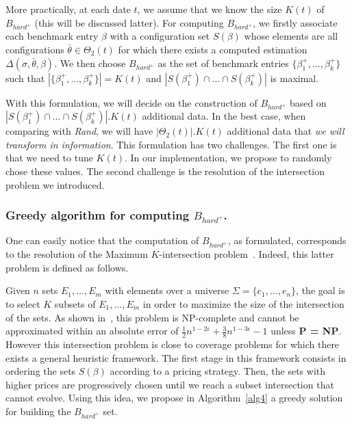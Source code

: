 \documentclass[10pt, conference, compsocconf]{IEEEtran}
\begin{document}
More practically, at each date $t$, we assume that we know the size
$K(t)$ of $B_{hard^+}$ (this will be discussed latter).  For computing
$B_{hard^+}$, we firstly associate each benchmark entry $\beta$ with a
configuration set $S(\beta)$ whose elements are all configurations
$\bar{\theta} \in \Theta_2(t)$ for which there exists a computed
estimation $\Delta(\sigma, \bar{\theta}, \beta)$. We then choose
$B_{hard^+}$ as the set of benchmark entries
$\{ \beta^+_1, \dots, \beta^+_k \}$ such that
$|\{ \beta^+_1, \dots, \beta^+_k \}| = K(t)$ and
$|S(\beta^+_1) \cap \dots \cap S(\beta^+_k)|$ is maximal.


With this formulation, we will decide on the construction of
$B_{hard^+}$ based on
$|S(\beta^+_1) \cap \dots \cap S(\beta^+_k)|.K(t)$ additional data. In
the best case, when comparing with {\it Rand}, we will have
$|\Theta_2(t)|.K(t)$ additional data that {\it we will transform in
  information}.  This formulation has two challenges. The first one is
that we need to tune $K(t)$. In our implementation, we propose to
randomly chose these values. The second challenge is the resolution of
the intersection problem we introduced.

\subsubsection{ Greedy algorithm for computing $B_{hard^+}$.}

One can easily notice that the computation of $B_{hard^+}$, as
formulated, corresponds to the resolution of the Maximum $K$-intersection
problem~\cite{DBLP:journals/ipl/ShiehTY12}.  Indeed, this latter
problem is defined as follows.

Given $n$ sets $E_1,\dots,E_m$ with elements over a universe
$\Sigma = \{ e_1,\dots,e_n  \}$, the goal is to select $K$ subsets of
$E_1,\dots,E_m$ in order to maximize the size of the intersection of
the sets.  As shown in~\cite{DBLP:journals/ipl/ShiehTY12}, this
problem is NP-complete and cannot be approximated within an absolute
error of $\frac{1}{2}n^{1-2\epsilon} + \frac{3}{8}n^{1-3\epsilon} - 1$
unless {\bf P = NP}.  However this intersection problem is close to
coverage problems for which there exists a general heuristic
framework. The first stage in this framework consists in ordering the
sets $S(\beta)$ according to a pricing strategy. Then, the sets with
higher prices are progressively chosen until we reach a subset
intersection that cannot evolve. Using this idea, we propose in
Algorithm~\ref{alg4} a greedy solution for building the $B_{hard^+}$
set.
\end{document}
